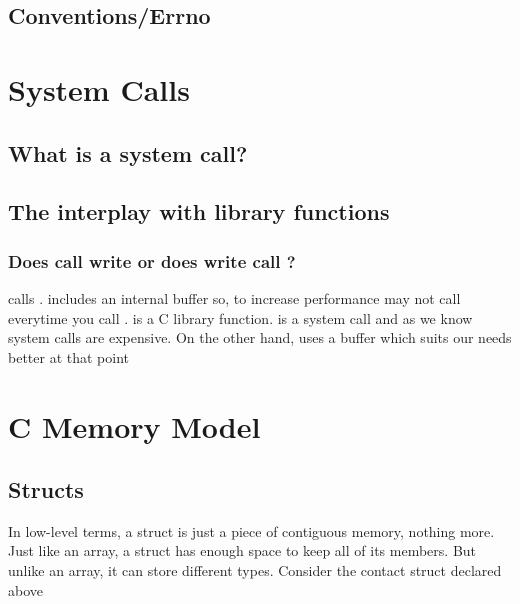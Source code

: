 \subsection{Conventions/Errno}


\section{System Calls}

\subsection{What is a system call?}


\subsection{The interplay with library functions}


\subsubsection{Does  call write or does write call ?}

 calls .  includes an
internal buffer so, to increase performance  may not call
 everytime you call .  is a
C library function.  is a system call and as we know
system calls are expensive. On the other hand,  uses a
buffer which suits our needs better at that point

\section{C Memory Model}

\subsection{Structs}


In low-level terms, a struct is just a piece of contiguous memory, nothing more. Just like an array, a struct has enough space to keep all of its members. But unlike an array, it can store different types. Consider the contact struct declared above

